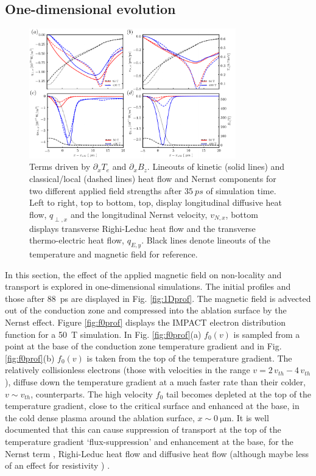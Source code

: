\documentclass[aip,reprint]{revtex4-1}
\begin{document}
\subsection{One-dimensional evolution}
\label{sec:1D}
\begin{figure}
	\includegraphics[width=0.8\textwidth]{pics/qlineouts_4plots.pdf}%
	\caption{\label{fig:qlineouts} \label{fig:qperp_1d} Terms driven by $\partial_x T_e$ and $\partial_x B_{z}$. Lineouts of kinetic (solid lines) and classical/local (dashed lines) heat flow  and Nernst components for two different applied field strengths after $\SI{35}{ps}$ of simulation time. Left to right, top to bottom, top, display longitudinal diffusive heat flow, $q_{\perp,x}$ and the longitudinal Nernst velocity, $v_{N,x}$, bottom displays transverse Righi-Leduc heat flow and the transverse thermo-electric heat flow, $q_{E,y}$. Black lines denote lineouts of the temperature and magnetic field for reference. }%
\end{figure}


In this section, the effect of the applied magnetic field on non-locality and transport is explored in one-dimensional simulations. The initial profiles and those after \SI{88}{ps} are displayed in Fig. \ref{fig:1Dprof}.  The magnetic field is advected out of the conduction zone and compressed into the ablation surface by the Nernst effect. Figure \ref{fig:f0prof} displays the IMPACT electron distribution function  for a  \SI{50}{T}  simulation.  In Fig. \ref{fig:f0prof}(a) $f_0(v)$ is sampled from a point at the base of the conduction zone temperature gradient and in Fig. \ref{fig:f0prof}(b) $f_0(v)$ is taken from the top of the temperature gradient. The relatively collisionless electrons (those with velocities in the range $v=2\,\si{v_{th}}-4\,\si{v_{th}}$), diffuse down the temperature gradient at a much faster rate than their colder, $v \sim \si{v_{th}}$, counterparts.   The high velocity $f_0$ tail becomes depleted at the top of the temperature gradient, close to the critical surface and enhanced at the base, in the cold dense plasma around the ablation surface, $x\sim \SI{0}{\micro\meter}$. It is well documented that this can cause suppression of transport at the top of the temperature gradient `flux-suppression' and enhancement at the base, for the Nernst term \cite{Brodrick2018}\cite{Joglekar2016}, Righi-Leduc heat flow \cite{Kho1985} and diffusive heat flow \cite{Bell1981} (although maybe less of an effect for resistivity \cite{Williams2013}) .
\end{document}
